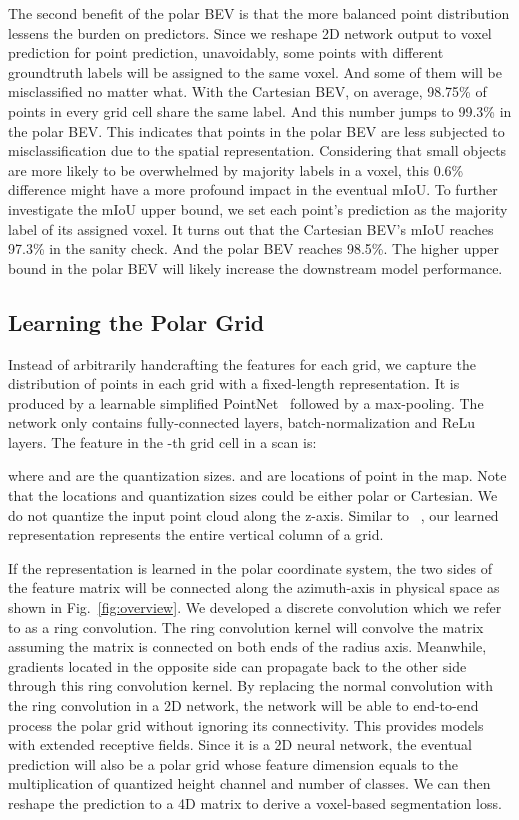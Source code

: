\documentclass[10pt,twocolumn,letterpaper]{article}
\begin{document}
The second benefit of the polar BEV is that the more balanced point distribution lessens the burden on predictors. Since we reshape 2D network output to voxel prediction for point prediction, unavoidably, some points with different groundtruth labels will be assigned to the same voxel. And some of them will be misclassified no matter what. With the Cartesian BEV, on average, 98.75\% of points in every grid cell share the same label. And this number jumps to 99.3\% in the polar BEV. This indicates that points in the polar BEV are less subjected to misclassification due to the spatial representation. Considering that small objects are more likely to be overwhelmed by majority labels in a voxel, this 0.6\% difference might have a more profound impact in the eventual mIoU. To further investigate the mIoU upper bound, we set each point's prediction as the majority label of its assigned voxel. It turns out that the Cartesian BEV's mIoU reaches 97.3\% in the sanity check. And the polar BEV reaches 98.5\%. The higher upper bound in the polar BEV will likely increase the downstream model performance.
 
 \subsection{Learning the Polar Grid}

Instead of arbitrarily handcrafting the features for each grid, we capture the distribution of points in each grid with a fixed-length representation. It is produced by a learnable simplified PointNet~\cite{qi2017pointnet}  followed by a max-pooling. The network only contains fully-connected layers, batch-normalization and ReLu layers. The feature in the -th grid cell in a scan is:



\noindent where  and  are the quantization sizes.  and  are locations of point  in the map. Note that the locations and quantization sizes could be either polar or Cartesian. We do not quantize the input point cloud along the z-axis. Similar to ~\cite{lang2019pointpillars}, our learned representation represents the entire vertical column of a grid.

If the representation is learned in the polar coordinate system, the two sides of the feature matrix will be connected along the azimuth-axis in physical space as shown in Fig.~\ref{fig:overview}. We developed a discrete convolution which we refer to as a ring convolution. The ring convolution kernel will convolve the matrix assuming the matrix is connected on both ends of the radius axis. Meanwhile, gradients located in the opposite side can propagate back to the other side through this ring convolution kernel. By replacing the normal convolution with the ring convolution in a 2D network, the network will be able to end-to-end process the polar grid without ignoring its connectivity. This provides models with extended receptive fields. Since it is a 2D neural network, the eventual prediction will also be a polar grid whose feature dimension equals to the multiplication of quantized height channel and number of classes. We can then reshape the prediction to a 4D matrix to derive a voxel-based segmentation loss.
\end{document}
